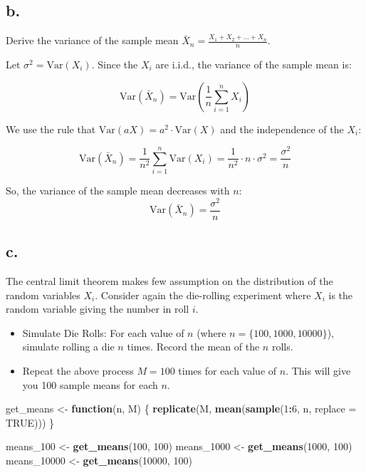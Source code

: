 \documentclass[
]{article}
\newenvironment{Shaded}{\begin{snugshade}}{\end{snugshade}}
\newcommand{\AttributeTok}[1]{\textcolor[rgb]{0.13,0.29,0.53}{#1}}
\newcommand{\ConstantTok}[1]{\textcolor[rgb]{0.56,0.35,0.01}{#1}}
\newcommand{\ControlFlowTok}[1]{\textcolor[rgb]{0.13,0.29,0.53}{\textbf{#1}}}
\newcommand{\DecValTok}[1]{\textcolor[rgb]{0.00,0.00,0.81}{#1}}
\newcommand{\FunctionTok}[1]{\textcolor[rgb]{0.13,0.29,0.53}{\textbf{#1}}}
\newcommand{\NormalTok}[1]{#1}
\newcommand{\OtherTok}[1]{\textcolor[rgb]{0.56,0.35,0.01}{#1}}
\newcommand{\SpecialCharTok}[1]{\textcolor[rgb]{0.81,0.36,0.00}{\textbf{#1}}}
\begin{document}
\subsection{b.}\label{b.-3}

Derive the variance of the sample mean
\(\bar X_n=\frac{X_1+X_2+\ldots+X_n}{n}\).

Let \(\sigma^2 = \text{Var}(X_i)\). Since the \(X_i\) are i.i.d., the
variance of the sample mean is:

\[
\text{Var}(\bar{X}_n) = \text{Var}\left( \frac{1}{n} \sum_{i=1}^n X_i \right)
\]

We use the rule that \(\text{Var}(aX) = a^2 \cdot \text{Var}(X)\) and
the independence of the \(X_i\):

\[
\text{Var}(\bar{X}_n) = \frac{1}{n^2} \sum_{i=1}^n \text{Var}(X_i)
= \frac{1}{n^2} \cdot n \cdot \sigma^2 = \frac{\sigma^2}{n}
\]

So, the variance of the sample mean decreases with \(n\): \[
\text{Var}(\bar{X}_n) = \frac{\sigma^2}{n}
\]

\subsection{c.~}\label{c.-3}

The central limit theorem makes few assumption on the distribution of
the random variables \(X_i\). Consider again the die-rolling experiment
where \(X_i\) is the random variable giving the number in roll \(i\).

\begin{itemize}
\item
  Simulate Die Rolls: For each value of \(n\) (where
  \(n=\{100,1000,10000\}\)), simulate rolling a die \(n\) times. Record
  the mean of the \(n\) rolls.
\item
  Repeat the above process \(M=100\) times for each value of \(n\). This
  will give you 100 sample means for each \(n\).
\end{itemize}

\begin{Shaded}
\begin{Highlighting}[]
\NormalTok{get\_means }\OtherTok{\textless{}{-}} \ControlFlowTok{function}\NormalTok{(n, M) \{}
  \FunctionTok{replicate}\NormalTok{(M, }\FunctionTok{mean}\NormalTok{(}\FunctionTok{sample}\NormalTok{(}\DecValTok{1}\SpecialCharTok{:}\DecValTok{6}\NormalTok{, n, }\AttributeTok{replace =} \ConstantTok{TRUE}\NormalTok{)))}
\NormalTok{\}}

\NormalTok{means\_100 }\OtherTok{\textless{}{-}} \FunctionTok{get\_means}\NormalTok{(}\DecValTok{100}\NormalTok{, }\DecValTok{100}\NormalTok{)}
\NormalTok{means\_1000 }\OtherTok{\textless{}{-}} \FunctionTok{get\_means}\NormalTok{(}\DecValTok{1000}\NormalTok{, }\DecValTok{100}\NormalTok{)}
\NormalTok{means\_10000 }\OtherTok{\textless{}{-}} \FunctionTok{get\_means}\NormalTok{(}\DecValTok{10000}\NormalTok{, }\DecValTok{100}\NormalTok{)}
\end{Highlighting}
\end{Shaded}
\end{document}
